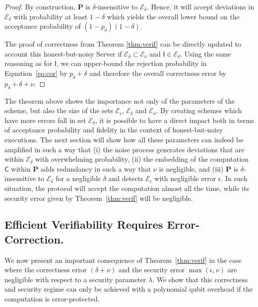 \documentclass[12pt]{iopart}
\newcommand{\cptp}[1]{\mathsf{#1}} \newcommand{\pd}[1]{\mathcal{#1}}  \newcommand{\sch}[1]{\bm{#1}}
\newcommand{\Id}{\cptp{I}}
\renewcommand{\1}{\mathds{1}}
\begin{document}
\begin{proof}
By construction, $\sch P$ is $\delta$-insensitive to $\mathcal E_\delta$. Hence, it will accept deviations in $\mathcal E_\delta$ with probability at least $1-\delta$ which yields the overall lower bound on the acceptance probability of $(1 - p_\delta) (1 - \delta)$.

The proof of correctness from Theorem \ref{thm:verif} can be directly updated to account this honest-but-noisy Server if $\mathcal{E}_\delta \subset \mathcal{E}_\nu$ and $\Id \in \mathcal{E}_\delta$. Using the same reasoning as for $\Id$, we can upper-bound the rejection probability in Equation~\ref{eq:cor} by $p_\delta + \delta$ and therefore the overall correctness error by $p_\delta + \delta + \nu$.
\end{proof}

The theorem above shows the importance not only of the parameters of the scheme, but also the size of the sets $\mathcal{E}_\epsilon$, $\mathcal{E}_\delta$ and $\mathcal{E}_\nu$. By creating schemes which have more errors fall in set $\mathcal{E}_\delta$, it is possible to have a direct impact both in terms of acceptance probability and fidelity in the context of honest-but-noisy executions. The next section will show how all these parameters can indeed be amplified in such a way that (i) the noise process generates deviations that are within $\mathcal E_\delta$ with overwhelming probability, (ii) the embedding of the computation $\cptp C$ within $\sch P$ adds redundancy in such a way that $\nu$ is negligible, and (iii) $\sch P$ is $\delta$-insensitive to $\mathcal E_\delta$ for a negligible $\delta$ and detects $\mathcal E_\epsilon$ with negligible error $\epsilon$. In such situation, the protocol will accept the computation almost all the time, while its security error given by Theorem~\ref{thm:verif} will be negligible.



\subsection{Efficient Verifiability Requires Error-Correction.}
We now present an important consequence of Theorem~\ref{thm:verif} in the case where the correctness error $(\delta+\nu)$ and the security error $\max(\epsilon,\nu)$ are negligible with respect to a security parameter $\lambda$.
We show that this correctness and security regime can only be achieved with a polynomial qubit overhead if the computation is error-protected.
\end{document}
